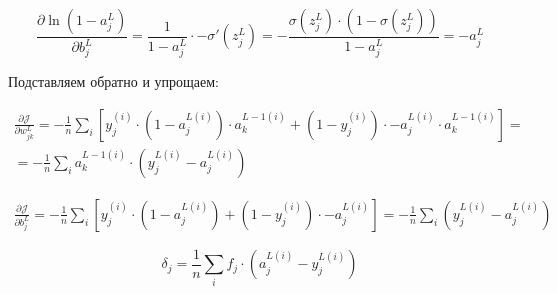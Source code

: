 \documentclass{article}
\begin{document}
\[
\frac{\partial \ln (1 - a_j^L)}{\partial b_{j}^L} = \frac{1}{1 - a_j^L} \cdot -\sigma' (z_j^L) = - \frac{\sigma(z_j^L) \cdot (1 - \sigma(z_j^L))}{1 - a_j^L} = -a_j^L
\]


Подставляем обратно и упрощаем:

\[
\begin{gathered}
\frac{\partial \mathcal{J}}{\partial w_{jk}^L} = -\frac{1}{n} \sum_i \left[ y_j^{(i)} \cdot (1 - a_j^{L(i)}) \cdot a_k^{L-1(i)}  + (1 - y_j^{(i)}) \cdot -a_j^{L(i)} \cdot a_k^{L-1(i)} \right] = \\ = -\frac{1}{n} \sum_i a_k^{L-1(i)} \cdot (y_j^{L(i)} - a_j^{L(i)})
\end{gathered}
\]

\[
\begin{gathered}
\frac{\partial \mathcal{J}}{\partial b_{j}^L} = -\frac{1}{n} \sum_i \left[ y_j^{(i)} \cdot (1 - a_j^{L(i)}) + (1 - y_j^{(i)}) \cdot -a_j^{L(i)} \right] = -\frac{1}{n} \sum_i (y_j^{L(i)} - a_j^{L(i)})
\end{gathered}
\]

\[
\delta_j = \frac{1}{n} \sum_i f_j \cdot (a_j^{L(i)} - y_j^{L(i)})
\]
\end{document}
